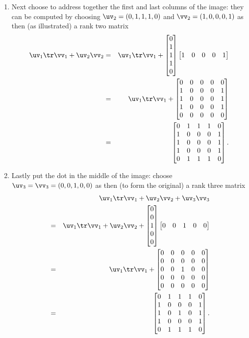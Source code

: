 \begin{example}
\begin{solution}
\begin{enumerate}
\item Next choose to address together the first and last columns of the image: they can be computed by choosing  \(\uv_2=(0,1,1,1,0)\) and \(\vv_2=(1,0,0,0,1)\) as then (as illustrated) a rank two matrix
\marginpar{}
\begin{eqnarray*}
\uv_1\tr\vv_1+\uv_2\vv_2
&=&\uv_1\tr\vv_1+\begin{bmatrix} 0\\1\\1\\1\\0 \end{bmatrix}
\begin{bmatrix} 1&0&0&0&1 \end{bmatrix}
\\&=&\uv_1\tr\vv_1+\begin{bmatrix} 0&0&0&0&0
\\1&0&0&0&1
\\1&0&0&0&1
\\1&0&0&0&1
\\0&0&0&0&0 \end{bmatrix}
\\&=&\begin{bmatrix} 0&1&1&1&0
\\1&0&0&0&1
\\1&0&0&0&1
\\1&0&0&0&1
\\0&1&1&1&0 \end{bmatrix}.
\end{eqnarray*}

\item Lastly put the dot in the middle of the image: choose  \(\uv_3=\vv_3=(0,0,1,0,0)\) as then (to form the original) a rank three matrix
\begin{eqnarray*}
&&\uv_1\tr\vv_1+\uv_2\vv_2+\uv_3\vv_3
\\&=&\uv_1\tr\vv_1+\uv_2\vv_2
+\begin{bmatrix} 0\\0\\1\\0\\0 \end{bmatrix}
\begin{bmatrix} 0&0&1&0&0 \end{bmatrix}
\\&=&\uv_1\tr\vv_1+\begin{bmatrix} 0&0&0&0&0
\\0&0&0&0&0
\\0&0&1&0&0
\\0&0&0&0&0
\\0&0&0&0&0 \end{bmatrix}
\\&=&\begin{bmatrix} 0&1&1&1&0
\\1&0&0&0&1
\\1&0&1&0&1
\\1&0&0&0&1
\\0&1&1&1&0 \end{bmatrix}.
\end{eqnarray*}


\end{enumerate}
\end{solution}
\end{example}

